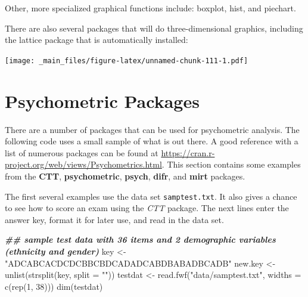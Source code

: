 \documentclass[
]{book}
\newenvironment{Shaded}{\begin{snugshade}}{\end{snugshade}}
\newcommand{\AttributeTok}[1]{\textcolor[rgb]{0.77,0.63,0.00}{#1}}
\newcommand{\DecValTok}[1]{\textcolor[rgb]{0.00,0.00,0.81}{#1}}
\newcommand{\DocumentationTok}[1]{\textcolor[rgb]{0.56,0.35,0.01}{\textbf{\textit{#1}}}}
\newcommand{\FunctionTok}[1]{\textcolor[rgb]{0.00,0.00,0.00}{#1}}
\newcommand{\NormalTok}[1]{#1}
\newcommand{\OtherTok}[1]{\textcolor[rgb]{0.56,0.35,0.01}{#1}}
\newcommand{\SpecialCharTok}[1]{\textcolor[rgb]{0.00,0.00,0.00}{#1}}
\newcommand{\StringTok}[1]{\textcolor[rgb]{0.31,0.60,0.02}{#1}}
\begin{document}
Other, more specialized graphical functions include: boxplot, hist, and piechart.

There are also several packages that will do three-dimensional graphics, including the lattice package that is automatically installed:

\begin{Shaded}
\end{Shaded}

\texttt{[image: \_main\_files/figure-latex/unnamed-chunk-111-1.pdf]}

\hypertarget{psychometric-packages}{%
\chapter{Psychometric Packages}\label{psychometric-packages}}

There are a number of packages that can be used for psychometric analysis. The following code uses a small sample of what is out there. A good reference with a list of numerous packages can be found at \url{https://cran.r-project.org/web/views/Psychometrics.html}. This section contains some examples from the \textbf{CTT}, \textbf{psychometric}, \textbf{psych}, \textbf{difr}, and \textbf{mirt} packages.

The first several examples use the data set \texttt{samptest.txt}. It also gives a chance to see how to score an exam using the \emph{CTT} package. The next lines enter the answer key, format it for later use, and read in the data set.

\begin{Shaded}
\begin{Highlighting}[]
\DocumentationTok{\#\# sample test data with 36 items and 2 demographic variables (ethnicity and gender)}
\NormalTok{key }\OtherTok{\textless{}{-}} \StringTok{"ADCABCACDCDCBBCBDCADADCABDBABADBCADB"}
\NormalTok{new.key }\OtherTok{\textless{}{-}} \FunctionTok{unlist}\NormalTok{(}\FunctionTok{strsplit}\NormalTok{(key, }\AttributeTok{split =} \StringTok{""}\NormalTok{))}
\NormalTok{testdat }\OtherTok{\textless{}{-}} \FunctionTok{read.fwf}\NormalTok{(}\StringTok{"data/samptest.txt"}\NormalTok{, }\AttributeTok{widths =} \FunctionTok{c}\NormalTok{(}\FunctionTok{rep}\NormalTok{(}\DecValTok{1}\NormalTok{, }\DecValTok{38}\NormalTok{)))}
\FunctionTok{dim}\NormalTok{(testdat)}
\end{Highlighting}
\end{Shaded}
\end{document}

